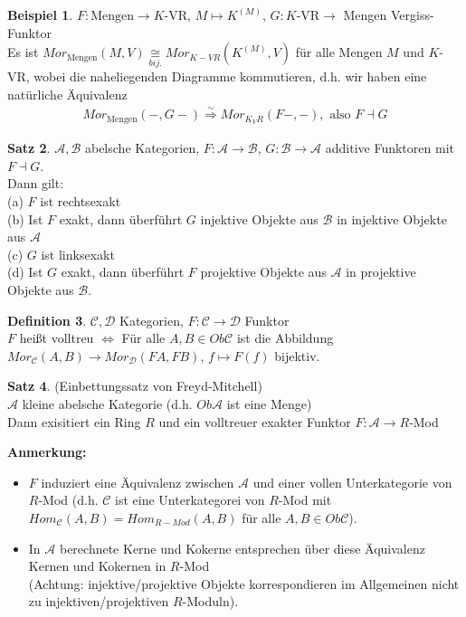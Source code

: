 \documentclass[10pt,a4paper,numbers=endperiod]{scrreprt}
\theoremstyle{definition}
\newtheorem{satz}{Satz}[section]
\newtheorem{defi}[satz]{Definition}
\newtheorem{bsp}[satz]{Beispiel}
\begin{document}
\begin{bsp}
	$F: \text{Mengen} \to K$-VR, $M \mapsto K^{(M)}$, $G: K\text{-VR} \to$ Mengen Vergiss-Funktor\\
	Es ist $Mor_{\text{Mengen}}(M, V) \underset{bij.}{\cong} Mor_{K-VR} (K^{(M)}, V)$ für alle Mengen $M$ und $K$-VR, wobei die naheliegenden Diagramme kommutieren, d.h. wir haben eine natürliche Äquivalenz \begin{align*}
		Mor_{\text{Mengen}}(-, G-) \overset{\sim}{\Rightarrow} Mor_{K_VR} (F-, -), \text{ also } F \dashv G
	\end{align*}
\end{bsp}

\begin{satz}
	$\mathcal{A}, \mathcal{B}$ abelsche Kategorien, $F: \mathcal{A} \to \mathcal{B}$, $G: \mathcal{B} \to \mathcal{A}$ additive Funktoren mit $F \dashv G$.\\
	Dann gilt:\\
	(a) $F$ ist rechtsexakt\\
	(b) Ist $F$ exakt, dann überführt $G$ injektive Objekte aus $\mathcal{B}$ in injektive Objekte aus $\mathcal{A}$\\
	(c) $G$ ist linksexakt\\
	(d) Ist $G$ exakt, dann überführt $F$ projektive Objekte aus $\mathcal{A}$ in projektive Objekte aus $\mathcal{B}$.
\end{satz}

\begin{defi}
	$\mathcal{C}, \mathcal{D}$ Kategorien, $F: \mathcal{C} \to \mathcal{D}$ Funktor\\
	$F$ heißt volltreu $\Leftrightarrow$ Für alle $A, B \in Ob \mathcal{C}$ ist die Abbildung $Mor_\mathcal{C} (A, B) \longrightarrow Mor_\mathcal{D} (FA, FB)$, $f \mapsto F(f)$ bijektiv.
\end{defi}

\begin{satz}
	(Einbettungssatz von Freyd-Mitchell)\\
	$\mathcal{A}$ kleine abelsche Kategorie (d.h. $Ob \mathcal{A}$ ist eine Menge)\\
	Dann exisitiert ein Ring $R$ und ein volltreuer exakter Funktor $F: \mathcal{A} \to R$-Mod
\end{satz}

\textbf{Anmerkung:} \begin{itemize}
	\item $F$ induziert eine Äquivalenz zwischen $\mathcal{A}$ und einer vollen Unterkategorie von $R$-Mod (d.h. $\mathcal{C}$ ist eine Unterkategorei von $R$-Mod mit $Hom_\mathcal{C}(A, B) = Hom_{R-Mod} (A, B)$ für alle $A, B \in Ob \mathcal{C}$).
	\item In $\mathcal{A}$ berechnete Kerne und Kokerne entsprechen über diese Äquivalenz Kernen und Kokernen in $R$-Mod\\
	(Achtung: injektive/projektive Objekte korrespondieren im Allgemeinen nicht zu injektiven/projektiven $R$-Moduln).
\end{itemize}
\end{document}
